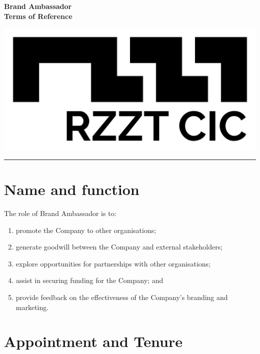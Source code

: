 \documentclass[a4paper,10pt]{article}
\renewcommand{\labelenumi}{(\arabic{enumi})}
\begin{document}
\thispagestyle{firstpage}

\begin{minipage}[b]{0.75\textwidth}
  \raggedright
  \LARGE{\textbf{Brand Ambassador\\Terms of Reference}}
  \vspace{0.05em}
\end{minipage}
%
\begin{minipage}[b]{0.25\textwidth}
  \raggedleft
  \includegraphics[width=1\textwidth]{logo-black.jpg}
\end{minipage}

\hrule

\vspace{2em}

\section{Name and function}

The role of Brand Ambassador is to:

\begin{enumerate}
    \renewcommand{\labelenumi}{(\alph{enumi})}
    \item promote the Company to other organisations;
    \item generate goodwill between the Company and external stakeholders;
    \item explore opportunities for partnerships with other organisations;
    \item assist in securing funding for the Company; and
    \item provide feedback on the effectiveness of the Company’s branding and marketing.
\end{enumerate}

\section{Appointment and Tenure}
\end{document}
